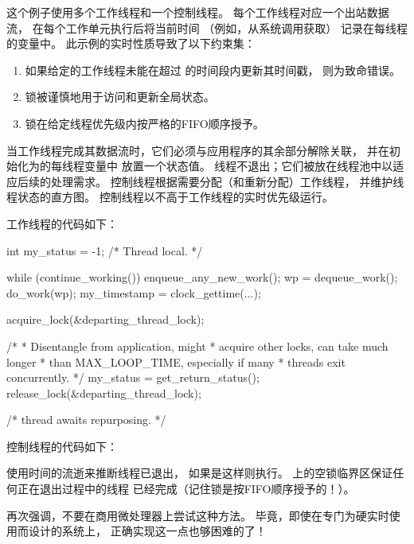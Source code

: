 {{	这个例子使用多个工作线程和一个控制线程。
	每个工作线程对应一个出站数据流，
	在每个工作单元执行后将当前时间
	（例如，从系统调用获取）
	记录在每线程的变量中。
	此示例的实时性质导致了以下约束集：

	\begin{enumerate}
	\item	如果给定的工作线程未能在超过
		的时间段内更新其时间戳，
		则为致命错误。
	\item	锁被谨慎地用于访问和更新全局状态。
	\item	锁在给定线程优先级内按严格的FIFO顺序授予。
	\end{enumerate}

	当工作线程完成其数据流时，它们必须与应用程序的其余部分解除关联，
	并在初始化为的每线程变量中
	放置一个状态值。
	线程不退出；它们被放在线程池中以适应后续的处理需求。
	控制线程根据需要分配（和重新分配）工作线程，
	并维护线程状态的直方图。
	控制线程以不高于工作线程的实时优先级运行。

	工作线程的代码如下：

\begin{VerbatimN}
	int my_status = -1;  /* Thread local. */

	while (continue_working()) {
		enqueue_any_new_work();
		wp = dequeue_work();
		do_work(wp);
		my_timestamp = clock_gettime(...);
	}

	acquire_lock(&departing_thread_lock);

	/*
	 * Disentangle from application, might
	 * acquire other locks, can take much longer
	 * than MAX_LOOP_TIME, especially if many
	 * threads exit concurrently.
	 */
	my_status = get_return_status();
	release_lock(&departing_thread_lock);

	/* thread awaits repurposing. */
\end{VerbatimN}

	控制线程的代码如下：

\begin{fcvlabel}
\end{fcvlabel}

	\begin{fcvref}
	使用时间的流逝来推断线程已退出，
	如果是这样则执行。
	上的空锁临界区保证任何正在退出过程中的线程
	已经完成（记住锁是按FIFO顺序授予的！）。
	\end{fcvref}

	再次强调，不要在商用微处理器上尝试这种方法。
	毕竟，即使在专门为硬实时使用而设计的系统上，
	正确实现这一点也够困难的了！
}\QuickQuizEndE
}

